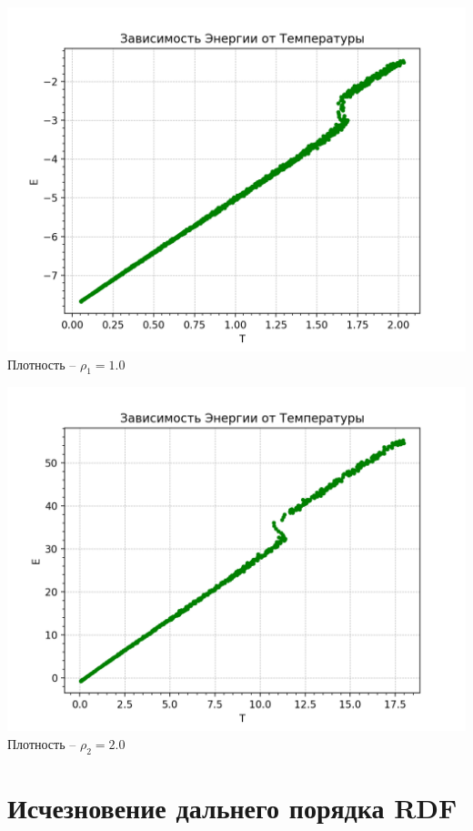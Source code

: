 \begin{minipage}{0.47\textwidth}
    \begin{center}
        \includegraphics[width=0.9\linewidth]{1.png}\\
        Плотность -- $\rho_1 = 1.0$
    \end{center}
   
\end{minipage}
\begin{minipage}{0.47\textwidth}
    \begin{center}
        \includegraphics[width=0.9\linewidth]{2.png}\\
        Плотность -- $\rho_2 = 2.0$
    \end{center}
\end{minipage}

\section{Исчезновение дальнего порядка RDF}

